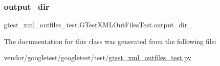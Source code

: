 \subsubsection{\texorpdfstring{output\+\_\+dir\+\_\+}{output\_dir\_}}
{\footnotesize\ttfamily gtest\+\_\+xml\+\_\+outfiles\+\_\+test.\+G\+Test\+X\+M\+L\+Out\+Files\+Test.\+output\+\_\+dir\+\_\+}



The documentation for this class was generated from the following file\+:\begin{DoxyCompactItemize}
\item 
vendor/googletest/googletest/test/\hyperlink{gtest__xml__outfiles__test_8py}{gtest\+\_\+xml\+\_\+outfiles\+\_\+test.\+py}\end{DoxyCompactItemize}
